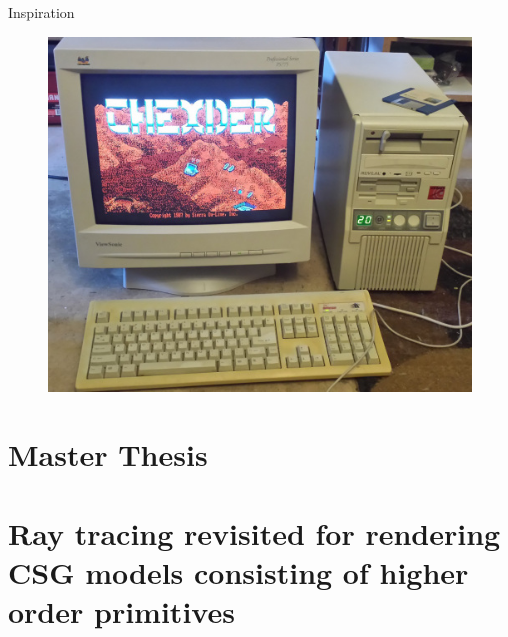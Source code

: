 \documentclass{beamer}
\begin{document}
\begin{frame}{Inspiration}
\begin{itemize}
\begin{figure}
{				\includegraphics[height=0.2\textheight]{figures/PC286.jpg}
			}
       	  \end{figure} 
	\end{itemize}
\end{frame}

\section{Master Thesis}

\section{Ray tracing revisited for rendering CSG models consisting of higher order primitives}
\end{document}
